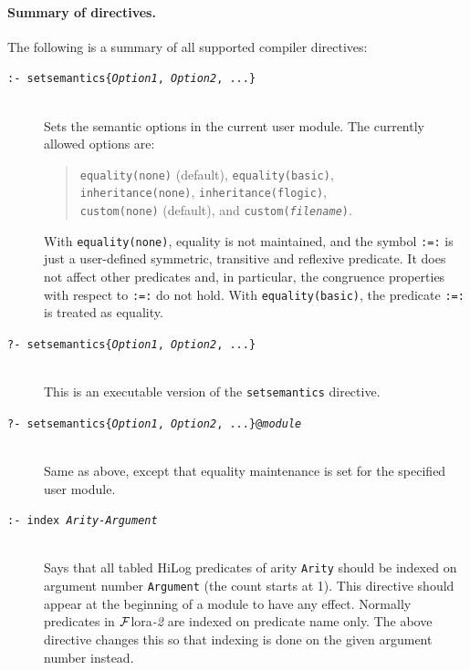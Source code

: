 \documentclass[11pt]{article}
\newcommand{\FLORA}{{\mbox{\sc ${\cal F}${lora}\rm\emph{-2}}}\xspace}
\begin{document}
\paragraph{Summary of directives.}
The following is a summary of all supported compiler directives:
\begin{description}
  \item[{\tt :- setsemantics\{\emph{Option1}, \emph{Option2}, ...\}}]
%
~~~\\
Sets the semantic options in the current user module.  The currently allowed
options are:
\begin{quote}
{\tt equality(none)} (default), {\tt equality(basic)},\\
{\tt inheritance(none)}, {\tt inheritance(flogic)},\\
{\tt custom(none)} (default), and {\tt custom(\emph{filename})}.
\end{quote}
  With {\tt equality(none)}, equality is not
maintained, and the symbol {\tt :=:} is just a user-defined symmetric,
transitive and reflexive predicate. It does not affect other predicates
and, in particular, the congruence properties with respect to \texttt{:=:} do
not hold.
With {\tt equality(basic)}, the predicate {\tt :=:} is treated as equality.
\item[{\tt ?- setsemantics\{\emph{Option1}, \emph{Option2}, ...\}}]
  ~~~\\
  This is an executable version of the {\tt setsemantics} directive.
\item[{\tt ?- setsemantics\{\emph{Option1}, \emph{Option2}, ...\}@\emph{module}}]
  ~~~\\
  Same as above, except that equality maintenance is set for the specified
  user module.
  
\item[{\tt :- index \emph{Arity-Argument} }]
  ~~~\\
  Says that all tabled HiLog predicates of arity {\tt Arity} should be indexed on
  argument number {\tt Argument} (the count starts at 1). This directive
  should appear at the beginning of a module to have any effect.
  Normally predicates in \FLORA are indexed on predicate name only.
  The  above directive changes this so that indexing is done on the given
  argument number instead.


\end{description}
\end{document}
